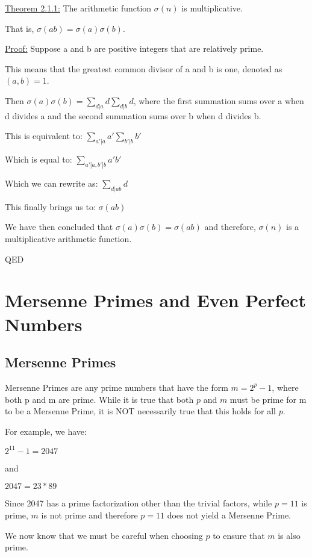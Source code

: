 \documentclass[12pt]{amsart}
\begin{document}
\underline{Theorem 2.1.1:} The arithmetic function $\sigma(n)$ is multiplicative. 

That is, $\sigma(ab) = \sigma(a) \sigma(b)$.

\underline{Proof:} Suppose a and b are positive integers that are relatively prime.

This means that the greatest common divisor of a and b is one, denoted as $(a,b) = 1$.

Then $\sigma(a) \sigma(b) = \sum_{d|a}{d} \sum_{d|b}{d}$, where the first summation sums over a when d divides a and the second summation sums over b when d divides b.

This is equivalent to: $\sum_{a'|a}{a'} \sum_{b'|b}{b'}$

Which is equal to: $\sum_{a'|a, b'|b}{a'b'}$

Which we can rewrite as: $\sum_{d|ab}{d}$

This finally brings us to: $\sigma(ab)$

We have then concluded that $\sigma(a) \sigma(b) = \sigma(ab)$ and therefore, $\sigma(n)$ is a multiplicative arithmetic function.

QED

\newpage

\section{Mersenne Primes and Even Perfect Numbers}

\subsection{Mersenne Primes}

Mersenne Primes are any prime numbers that have the form $m = 2^p - 1$, where both p and m are prime. While it is true that both $p$ and $m$ must be prime for m to be a Mersenne Prime, it is NOT necessarily true that this holds for all $p$.

For example, we have:
\begin{center}
$2^{11} - 1 = 2047$

and

$2047 = 23 * 89$
\end{center}

Since 2047 has a prime factorization other than the trivial factors, while $p = 11$ is prime, $m$ is not prime and therefore $p = 11$ does not yield a Mersenne Prime.

We now know that we must be careful when choosing $p$ to ensure that $m$ is also prime.
\end{document}
